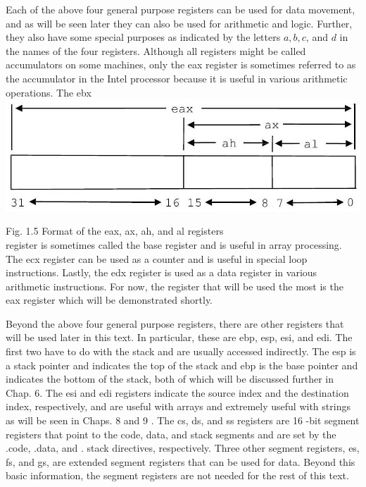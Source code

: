\documentclass[10pt]{article}
\begin{document}
Each of the above four general purpose registers can be used for data movement, and as will be seen later they can also be used for arithmetic and logic. Further, they also have some special purposes as indicated by the letters $a, b, c$, and $d$ in the names of the four registers. Although all registers might be called accumulators on some machines, only the eax register is sometimes referred to as the accumulator in the Intel processor because it is useful in various arithmetic operations. The ebx\\
\includegraphics[max width=\textwidth, center]{2025_03_24_ebe50cc223a6fbc49eecg-024}

Fig. 1.5 Format of the eax, ax, ah, and al registers\\
register is sometimes called the base register and is useful in array processing. The ecx register can be used as a counter and is useful in special loop instructions. Lastly, the edx register is used as a data register in various arithmetic instructions. For now, the register that will be used the most is the eax register which will be demonstrated shortly.

Beyond the above four general purpose registers, there are other registers that will be used later in this text. In particular, these are ebp, esp, esi, and edi. The first two have to do with the stack and are usually accessed indirectly. The esp is a stack pointer and indicates the top of the stack and ebp is the base pointer and indicates the bottom of the stack, both of which will be discussed further in Chap. 6. The esi and edi registers indicate the source index and the destination index, respectively, and are useful with arrays and extremely useful with strings as will be seen in Chaps. 8 and 9 . The cs, ds, and ss registers are 16 -bit segment registers that point to the code, data, and stack segments and are set by the .code, .data, and . stack directives, respectively. Three other segment registers, es, fs, and gs, are extended segment registers that can be used for data. Beyond this basic information, the segment registers are not needed for the rest of this text.
\end{document}
